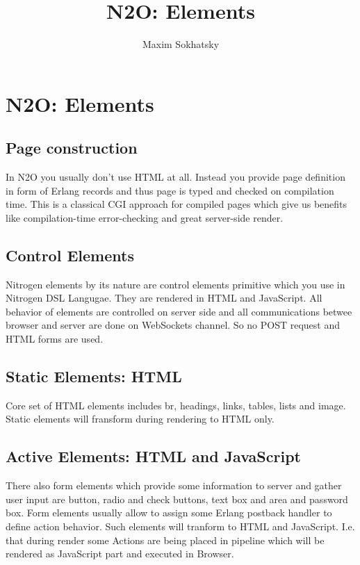 \documentclass[11pt]{article}
\begin{document}
\title{N2O: Elements}
\author{Maxim Sokhatsky}

\paragraph{}
\section*{N2O: Elements}

\subsection*{Page construction}
In N2O you usually don't use HTML at all. Instead you provide page definition
in form of Erlang records and thus page is typed and checked on compilation time.
This is a classical CGI approach for compiled pages which give us benefits like
compilation-time error-checking and great server-side render.

\subsection*{Control Elements}
Nitrogen elements by its nature are control elements primitive which
you use in Nitrogen DSL Langugae. They are rendered in HTML and JavaScript.
All behavior of elements are controlled on server side and all communications
betwee browser and server are done on WebSockets channel.
So no POST request and HTML forms are used.

\subsection*{Static Elements: HTML}
Core set of HTML elements includes br, headings, links, tables, lists and image.
Static elements will fransform during rendering to HTML only.

\subsection*{Active Elements: HTML and JavaScript}
There also form elements which provide some information to server
and gather user input are button, radio and check buttons, text box and area and password box.
Form elements usually allow to assign some Erlang postback handler to define action behavior.
Such elements will tranform to HTML and JavaScript. I.e. that during render some
Actions are being placed in pipeline which will be rendered as JavaScript part and executed in Browser.
\end{document}
